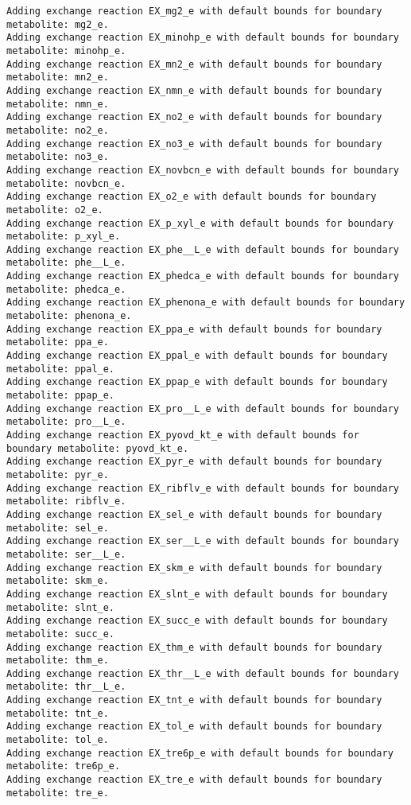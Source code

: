 \documentclass[
  letterpaper,
  DIV=11,
  numbers=noendperiod]{scrartcl}
\begin{document}
\begin{verbatim}
Adding exchange reaction EX_mg2_e with default bounds for boundary metabolite: mg2_e.
Adding exchange reaction EX_minohp_e with default bounds for boundary metabolite: minohp_e.
Adding exchange reaction EX_mn2_e with default bounds for boundary metabolite: mn2_e.
Adding exchange reaction EX_nmn_e with default bounds for boundary metabolite: nmn_e.
Adding exchange reaction EX_no2_e with default bounds for boundary metabolite: no2_e.
Adding exchange reaction EX_no3_e with default bounds for boundary metabolite: no3_e.
Adding exchange reaction EX_novbcn_e with default bounds for boundary metabolite: novbcn_e.
Adding exchange reaction EX_o2_e with default bounds for boundary metabolite: o2_e.
Adding exchange reaction EX_p_xyl_e with default bounds for boundary metabolite: p_xyl_e.
Adding exchange reaction EX_phe__L_e with default bounds for boundary metabolite: phe__L_e.
Adding exchange reaction EX_phedca_e with default bounds for boundary metabolite: phedca_e.
Adding exchange reaction EX_phenona_e with default bounds for boundary metabolite: phenona_e.
Adding exchange reaction EX_ppa_e with default bounds for boundary metabolite: ppa_e.
Adding exchange reaction EX_ppal_e with default bounds for boundary metabolite: ppal_e.
Adding exchange reaction EX_ppap_e with default bounds for boundary metabolite: ppap_e.
Adding exchange reaction EX_pro__L_e with default bounds for boundary metabolite: pro__L_e.
Adding exchange reaction EX_pyovd_kt_e with default bounds for boundary metabolite: pyovd_kt_e.
Adding exchange reaction EX_pyr_e with default bounds for boundary metabolite: pyr_e.
Adding exchange reaction EX_ribflv_e with default bounds for boundary metabolite: ribflv_e.
Adding exchange reaction EX_sel_e with default bounds for boundary metabolite: sel_e.
Adding exchange reaction EX_ser__L_e with default bounds for boundary metabolite: ser__L_e.
Adding exchange reaction EX_skm_e with default bounds for boundary metabolite: skm_e.
Adding exchange reaction EX_slnt_e with default bounds for boundary metabolite: slnt_e.
Adding exchange reaction EX_succ_e with default bounds for boundary metabolite: succ_e.
Adding exchange reaction EX_thm_e with default bounds for boundary metabolite: thm_e.
Adding exchange reaction EX_thr__L_e with default bounds for boundary metabolite: thr__L_e.
Adding exchange reaction EX_tnt_e with default bounds for boundary metabolite: tnt_e.
Adding exchange reaction EX_tol_e with default bounds for boundary metabolite: tol_e.
Adding exchange reaction EX_tre6p_e with default bounds for boundary metabolite: tre6p_e.
Adding exchange reaction EX_tre_e with default bounds for boundary metabolite: tre_e.

\end{verbatim}
\end{document}
